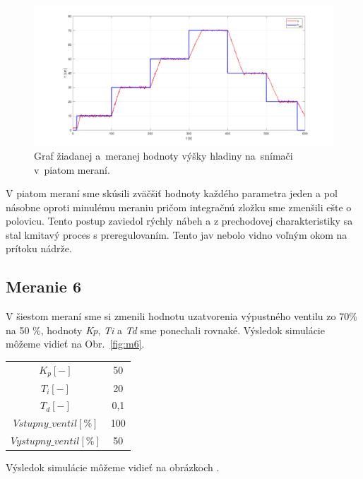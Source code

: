\documentclass{article}
\begin{document}
\begin{figure}[!htbp]
	\begin{center}
		\includegraphics[width=\textwidth]{./include/meranie5.png}
	\end{center}
	\caption{Graf žiadanej a~meranej hodnoty výšky hladiny na~snímači v~piatom meraní.}
	\label{fig:m5}
\end{figure}

V piatom meraní sme skúsili zväčšiť hodnoty každého parametra jeden a pol násobne oproti minulému meraniu 
pričom integračnú zložku sme zmenšili ešte o polovicu. Tento postup zaviedol rýchly nábeh a z prechodovej
charakteristiky sa stal kmitavý proces s preregulovaním. Tento jav nebolo vidno voľným okom na prítoku nádrže.

\clearpage

\subsection{Meranie 6}
\label{sec:meranie6}

V šiestom meraní sme si zmenili hodnotu uzatvorenia výpustného ventilu zo 70\% na 50 \%, hodnoty
\textit{Kp}, \textit{Ti} a \textit{Td} sme ponechali rovnaké. Výsledok simulácie môžeme vidieť na Obr.~\ref{fig:m6}.

\begin{center}
\begin{tabular}{ |c|c| }
 \hline
 $K_p [-]$ & 50 \\
 $T_i [-]$ & 20 \\
 $T_d [-]$ & 0,1 \\
 \hline
 $Vstupny\_ventil[\%]$ & 100 \\
 $Vystupny\_ventil[\%]$ & 50 \\
 \hline
\end{tabular}
\end{center}

Výsledok simulácie môžeme vidieť na obrázkoch  .
\end{document}
